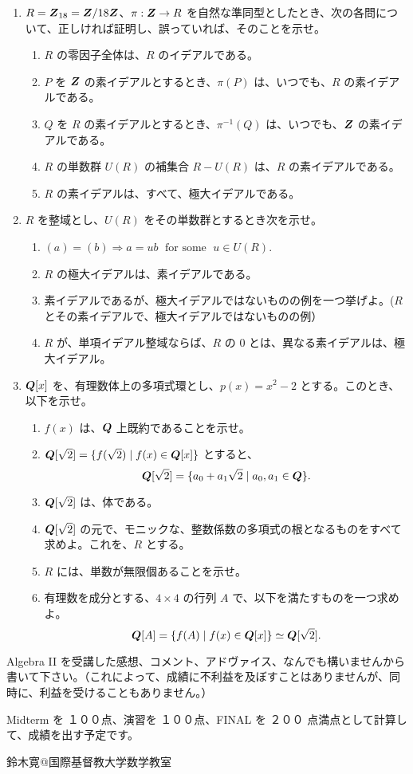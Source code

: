 \begin{enumerate}
\item $R = \mbox{\boldmath $Z$}_{18} = \mbox{\boldmath $Z$}/18\mbox{\boldmath $Z$}$、$\pi : \mbox{\boldmath $Z$} \to R$ を自然な準同型としたとき、次の各問について、正しければ証明し、誤っていれば、そのことを示せ。
     \begin{enumerate}
     \item $R$ の零因子全体は、$R$ のイデアルである。
     \item $P$ を $\mbox{\boldmath $Z$}$ の素イデアルとするとき、$\pi(P)$ は、いつでも、$R$ の素イデアルである。
     \item $Q$ を $R$ の素イデアルとするとき、$\pi^{-1}(Q)$ は、いつでも、$\mbox{\boldmath $Z$}$ の素イデアルである。
     \item $R$ の単数群 $U(R)$ の補集合 $R - U(R)$ は、$R$ の素イデアルである。
     \item $R$ の素イデアルは、すべて、極大イデアルである。
     \end{enumerate}

\item $R$ を整域とし、$U(R)$ をその単数群とするとき次を示せ。
     \begin{enumerate}
     \item $(a) = (b) \Rightarrow a = ub \;\mbox{ for some }\;u\in U(R)$.
     \item $R$ の極大イデアルは、素イデアルである。
     \item 素イデアルであるが、極大イデアルではないものの例を一つ挙げよ。($R$ とその素イデアルで、極大イデアルではないものの例）
     \item $R$ が、単項イデアル整域ならば、$R$ の $0$ とは、異なる素イデアルは、極大イデアル。
     \end{enumerate}
     
\item $\mbox{\boldmath $Q$}[x]$ を、有理数体上の多項式環とし、$p(x) = x^2 - 2$ とする。このとき、以下を示せ。
     \begin{enumerate}
     \item $f(x)$ は、$\mbox{\boldmath $Q$}$ 上既約であることを示せ。
     \item $\mbox{\boldmath $Q$}[\sqrt{2}] = \{f(\sqrt{2})\mid f(x)\in \mbox{\boldmath $Q$}[x]\}$ とすると、
     $$\mbox{\boldmath $Q$}[\sqrt{2}] = \{a_0 + a_1\sqrt{2}  \mid a_0, a_1\in \mbox{\boldmath $Q$}\}.$$
     \item $\mbox{\boldmath $Q$}[\sqrt{2}]$ は、体である。
     \item $\mbox{\boldmath $Q$}[\sqrt{2}]$ の元で、モニックな、整数係数の多項式の根となるものをすべて求めよ。これを、$R$ とする。
     \item $R$ には、単数が無限個あることを示せ。
     \item 有理数を成分とする、$4\times 4$ の行列 $A$ で、以下を満たすものを一つ求めよ。
     $$\mbox{\boldmath $Q$}[A] = \{f(A)\mid f(x)\in \mbox{\boldmath $Q$}[x]\} \simeq \mbox{\boldmath $Q$}[\sqrt{2}].$$
     \end{enumerate}
\end{enumerate}

 

\vspace{5ex}
\noindent Algebra II を受講した感想、コメント、アドヴァイス、なんでも構いませんから書いて下さい。（これによって、成績に不利益を及ぼすことはありませんが、同時に、利益を受けることもありません。）

\vspace{2ex}
\noindent
Midterm を １００点、演習を １００点、FINAL を ２００ 点満点として計算して、成績を出す予定です。
         

\begin{flushright}
鈴木寛@国際基督教大学数学教室
\end{flushright}
